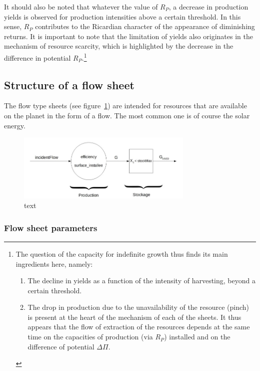 \documentclass[12pt,a4paper]{article}%
\begin{document}
It should also be noted that whatever the value of $R_{P}$, a decrease in production yields is observed for production intensities above a certain threshold. In this sense, $R_{P}$ contributes to the Ricardian character of the appearance of diminishing returns.  It is important to note that the limitation of yields also originates in the mechanism of resource scarcity, which is highlighted by the decrease in the difference in potential $R_{P}$.\footnote{
	The question of the capacity for indefinite growth thus finds its main ingredients here, namely:
	\begin{enumerate}
		\item The decline in yields as a function of the intensity of harvesting, beyond a certain threshold.
		\item The drop in production due to the unavailability of the resource (pinch) is present at the heart of the mechanism of each of the sheets. It thus appears that the flow of extraction of the resources depends at the same time on the capacities of production (via $R_{P}$) installed and on the difference of potential $\Delta\Pi$.
	\end{enumerate}}

\subsection{Structure of a flow sheet}
\label{sec:FLowSheet}

The flow type sheets (see figure~\ref{fig:FlowSheet}) are intended for resources that are available on the planet in the form of a flow. The most common one is of course the solar energy.

\begin{figure}[h]
	\centering
	\includegraphics[width=0.75\textwidth]{figures/FeuilleFlux.jpg}
	\caption{text}
	\label{fig:FlowSheet}
\end{figure}

\subsubsection{Flow sheet parameters}
\end{document}
